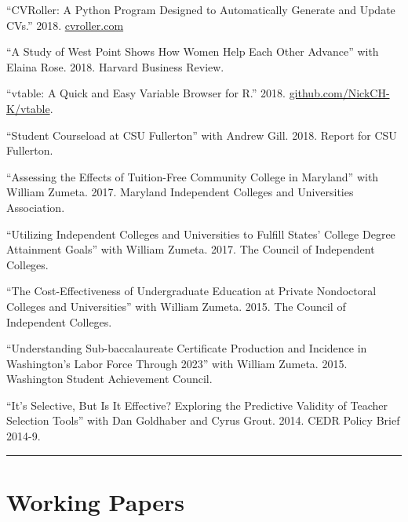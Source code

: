 \documentclass[11pt,a4paper]{article}
\begin{document}
\begin{hangparas}{.25in}{1}

``CVRoller: A Python Program Designed to Automatically Generate and Update CVs.'' 2018. \href{http://www.cvroller.com}{cvroller.com}



``A Study of West Point Shows How Women Help Each Other Advance'' with Elaina Rose. 2018. Harvard Business Review.



``vtable: A Quick and Easy Variable Browser for R.'' 2018. \href{https://www.github.com/NickCH-K/vtable}{github.com/NickCH-K/vtable}.



``Student Courseload at CSU Fullerton'' with Andrew Gill. 2018. Report for CSU Fullerton.



``Assessing the Effects of Tuition-Free Community College in Maryland'' with William Zumeta. 2017. Maryland Independent Colleges and Universities Association.



``Utilizing Independent Colleges and Universities to Fulfill States' College Degree Attainment Goals'' with William Zumeta. 2017. The Council of Independent Colleges.



``The Cost-Effectiveness of Undergraduate Education at Private Nondoctoral Colleges and Universities'' with William Zumeta. 2015. The Council of Independent Colleges.



``Understanding Sub-baccalaureate Certificate Production and Incidence in Washington's Labor Force Through 2023'' with William Zumeta. 2015. Washington Student Achievement Council.



``It's Selective, But Is It Effective? Exploring the Predictive Validity of Teacher Selection Tools'' with Dan Goldhaber and Cyrus Grout. 2014. CEDR Policy Brief 2014-9.

 

\end{hangparas}

\vspace{1cm} \hrule \vspace{1cm}





\section*{Working Papers} 
\end{document}
